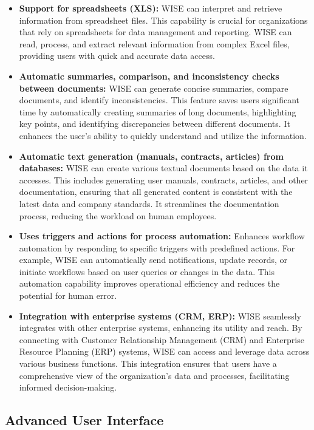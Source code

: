 \begin{itemize}
    \item \textbf{Support for spreadsheets (XLS):} WISE can interpret and retrieve information from spreadsheet files. This capability is crucial for organizations that rely on spreadsheets for data management and reporting. WISE can read, process, and extract relevant information from complex Excel files, providing users with quick and accurate data access.
    
    \item \textbf{Automatic summaries, comparison, and inconsistency checks between documents:} WISE can generate concise summaries, compare documents, and identify inconsistencies. This feature saves users significant time by automatically creating summaries of long documents, highlighting key points, and identifying discrepancies between different documents. It enhances the user's ability to quickly understand and utilize the information.
    
    \item \textbf{Automatic text generation (manuals, contracts, articles) from databases:} WISE can create various textual documents based on the data it accesses. This includes generating user manuals, contracts, articles, and other documentation, ensuring that all generated content is consistent with the latest data and company standards. It streamlines the documentation process, reducing the workload on human employees.
    
    \item \textbf{Uses triggers and actions for process automation:} Enhances workflow automation by responding to specific triggers with predefined actions. For example, WISE can automatically send notifications, update records, or initiate workflows based on user queries or changes in the data. This automation capability improves operational efficiency and reduces the potential for human error.
    
    \item \textbf{Integration with enterprise systems (CRM, ERP):} WISE seamlessly integrates with other enterprise systems, enhancing its utility and reach. By connecting with Customer Relationship Management (CRM) and Enterprise Resource Planning (ERP) systems, WISE can access and leverage data across various business functions. This integration ensures that users have a comprehensive view of the organization's data and processes, facilitating informed decision-making.
\end{itemize}

\subsection{Advanced User Interface}

